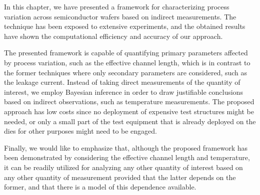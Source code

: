 In this chapter, we have presented a framework for characterizing process
variation across semiconductor wafers based on indirect measurements. The
technique has been exposed to extensive experiments, and the obtained results
have shown the computational efficiency and accuracy of our approach.

The presented framework is capable of quantifying primary parameters affected by
process variation, such as the effective channel length, which is in contrast to
the former techniques where only secondary parameters are considered, such as
the leakage current. Instead of taking direct measurements of the quantity of
interest, we employ Bayesian inference in order to draw justifiable conclusions
based on indirect observations, such as temperature measurements. The proposed
approach has low costs since no deployment of expensive test structures might be
needed, or only a small part of the test equipment that is already deployed on
the dies for other purposes might need to be engaged.

Finally, we would like to emphasize that, although the proposed framework has
been demonstrated by considering the effective channel length and temperature,
it can be readily utilized for analyzing any other quantity of interest based on
any other quantity of measurement provided that the latter depends on the
former, and that there is a model of this dependence available.
